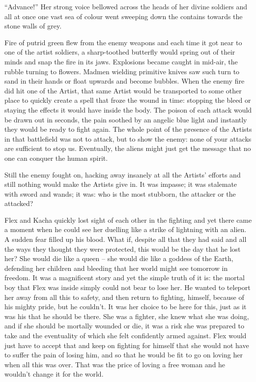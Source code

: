 “Advance!” Her strong voice bellowed across the heads of her divine
soldiers and all at once one vast sea of colour went sweeping down the
contains towards the stone walls of grey.

Fire of putrid green flew from the enemy weapons and each time it got
near to one of the artist soldiers, a sharp-toothed butterfly would
spring out of their minds and snap the fire in its jaws. Explosions
became caught in mid-air, the rubble turning to flowers. Madmen
wielding primitive knives saw such turn to sand in their hands or
float upwards and become bubbles. When the enemy fire did hit one of
the Artist, that same Artist would be transported to some other place
to quickly create a spell that froze the wound in time: stopping the
bleed or staying the effects it would have inside the body. The poison
of each attack would be drawn out in seconds, the pain soothed by an
angelic blue light and instantly they would be ready to fight
again. The whole point of the presence of the Artists in that
battlefield was not to attack, but to show the enemy: none of your
attacks are sufficient to stop us. Eventually, the aliens might just
get the message that no one can conquer the human spirit.

Still the enemy fought on, hacking away insanely at all the Artists’
efforts and still nothing would make the Artists give in. It was
impasse; it was stalemate with sword and wands; it was: who is the
most stubborn, the attacker or the attacked?

Flex and Kacha quickly lost sight of each other in the fighting and
yet there came a moment when he could see her duelling like a strike
of lightning with an alien. A sudden fear filled up his blood. What
if, despite all that they had said and all the ways they thought they
were protected, this would be the day that he lost her? She would die
like a queen – she would die like a goddess of the Earth, defending
her children and bleeding that her world might see tomorrow in
freedom. It was a magnificent story and yet the simple truth of it is:
the mortal boy that Flex was inside simply could not bear to lose
her. He wanted to teleport her away from all this to safety, and then
return to fighting, himself, because of his mighty pride, but he
couldn’t. It was her choice to be here for this, just as it was his
that he should be there. She was a fighter, she knew what she was
doing, and if she should be mortally wounded or die, it was a risk she
was prepared to take and the eventuality of which she felt confidently
armed against. Flex would just have to accept that and keep on
fighting for himself that she would not have to suffer the pain of
losing him, and so that he would be fit to go on loving her when all
this was over. That was the price of loving a free woman and he
wouldn’t change it for the world.

